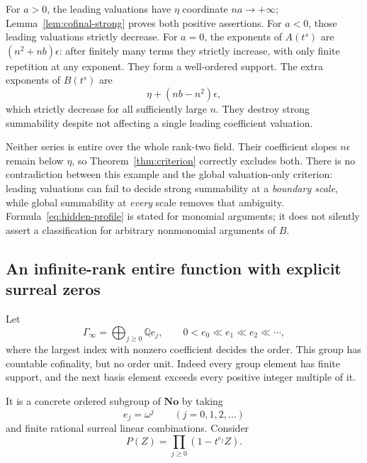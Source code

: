 \documentclass[11pt,letterpaper]{article}
\numberwithin{equation}{section}
\theoremstyle{definition}
\theoremstyle{remark}
\newcommand{\No}{\mathbf{No}}
\newcommand{\Q}{\mathbb Q}
\begin{document}
For $a>0$, the leading valuations have $\eta$ coordinate $na\to+\infty$;
Lemma~\ref{lem:cofinal-strong} proves both positive assertions. For $a<0$,
those leading valuations strictly decrease. For $a=0$, the exponents of
$A(t^s)$ are $(n^2+nb)\epsilon$: after finitely many terms they strictly
increase, with only finite repetition at any exponent. They form a well-ordered
support. The extra exponents of $B(t^s)$ are
\[
 \eta+(nb-n^2)\epsilon,
\]
which strictly decrease for all sufficiently large $n$. They destroy strong
summability despite not affecting a single leading coefficient valuation.

Neither series is entire over the whole rank-two field. Their coefficient
slopes $n\epsilon$ remain below $\eta$, so Theorem~\ref{thm:criterion}
correctly excludes both. There is no contradiction between this example and
the global valuation-only criterion: leading valuations can fail to decide
strong summability at a \emph{boundary scale}, while global summability at
\emph{every} scale removes that ambiguity. Formula~\eqref{eq:hidden-profile}
is stated for monomial arguments; it does not silently assert a classification
for arbitrary nonmonomial arguments of $B$.

\subsection{An infinite-rank entire function with explicit surreal zeros}
\label{subsec:infinite-rank}
Let
\begin{equation}\label{eq:Gamma-infinity}
 \Gamma_\infty=\bigoplus_{j\ge0}\Q e_j,
 \qquad 0<e_0\ll e_1\ll e_2\ll\cdots,
\end{equation}
where the largest index with nonzero coefficient decides the order.
This group has countable cofinality, but no order unit. Indeed every group
element has finite support, and the next basis element exceeds every positive
integer multiple of it.

It is a concrete ordered subgroup of $\No$ by taking
\[
 e_j=\omega^j\qquad(j=0,1,2,\ldots)
\]
and finite rational surreal linear combinations. Consider
\begin{equation}\label{eq:infinite-product}
 P(Z)=\prod_{j\ge0}(1-t^{e_j}Z).
\end{equation}
\end{document}
